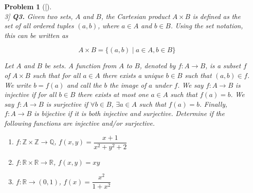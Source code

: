 \documentclass[12pt]{article}
\newtheorem{problemx}{Problem}
\newenvironment{problem}[1]{%
	\begin{problemx}[#1]\leavevmode\\[0.5em] %
	}{%
	\end{problemx}
}
\begin{document}
	
	\begin{problem}[3]
		\textbf{Q3.} Given two sets, $A$ and $B$, the \textit{Cartesian product} $A \times B$ is defined as the set of all ordered tuples $(a, b)$, where $a \in A$ and $b \in B$. Using the set notation, this can be written as
		
		$$A \times B = \{ (a, b) \mid a \in A, b \in B \}$$
		
		Let $A$ and $B$ be sets. A \textit{function} from $A$ to $B$, denoted by $f : A \rightarrow B$, is a subset $f$ of $A \times B$ such that for all $a \in A$ there exists a unique $b \in B$ such that $(a, b) \in f$. We write $b = f(a)$ and call the $b$ the \textit{image of} $a$ under $f$. We say $f : A \rightarrow B$ is \textit{injective} if for all $b \in B$ there exists at most one $a \in A$ such that $f(a) = b$. We say $f : A \rightarrow B$ is \textit{surjective} if $\forall b \in B$, $\exists a \in A$ such that $f(a) = b$. Finally, $f : A \rightarrow B$ is \textit{bijective} if it is both injective and surjective. Determine if the following functions are injective and/or surjective.
		
		\begin{enumerate}
			\item $f : \mathbb{Z} \times \mathbb{Z} \rightarrow \mathbb{Q}$, $f(x, y) = \dfrac{x + 1}{x^2 + y^2 + 2}$
			
			\item $f : \mathbb{R} \times \mathbb{R} \rightarrow \mathbb{R}$, $f(x, y) = xy$
			
			\item $f : \mathbb{R} \rightarrow (0, 1)$, $f(x) = \dfrac{x^2}{1 + x^2}$
		\end{enumerate}
	\end{problem}
	
\end{document}
